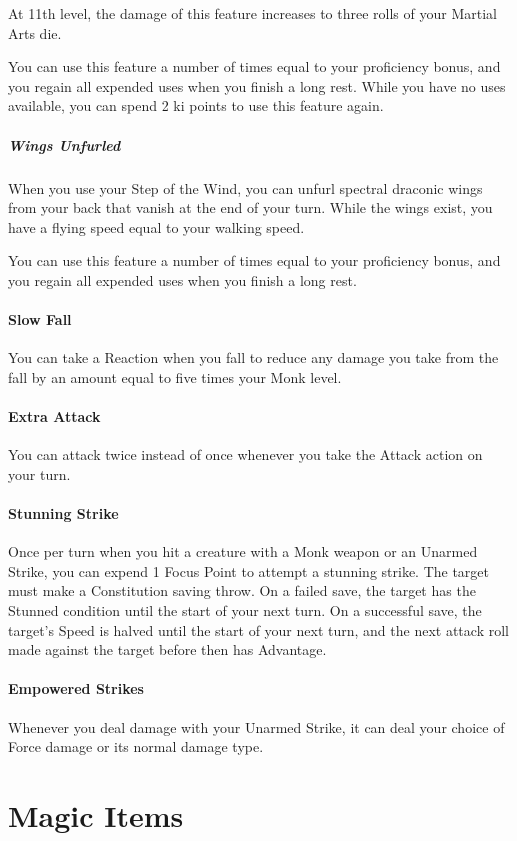 \documentclass[letterpaper,openany,oneside,twocolumn]{book}
\begin{document}
At 11th level, the damage of this feature increases to three rolls of your Martial Arts die.

You can use this feature a number of times equal to your proficiency bonus, and you regain all expended uses when you finish a long rest. While you have no uses available, you can spend 2 ki points to use this feature again.
\subsubsection*{Wings Unfurled}
When you use your Step of the Wind, you can unfurl spectral draconic wings from your back that vanish at the end of your turn. While the wings exist, you have a flying speed equal to your walking speed.

You can use this feature a number of times equal to your proficiency bonus, and you regain all expended uses when you finish a long rest.
\subsection*{Slow Fall}
You can take a Reaction when you fall to reduce any damage you take from the fall by an amount equal to five times your Monk level.
\subsection*{Extra Attack}
You can attack twice instead of once whenever you take the Attack action on your turn.
\subsection*{Stunning Strike}
Once per turn when you hit a creature with a Monk weapon or an Unarmed Strike, you can expend 1 Focus Point to attempt a stunning strike. The target must make a Constitution saving throw. On a failed save, the target has the Stunned condition until the start of your next turn. On a successful save, the target's Speed is halved until the start of your next turn, and the next attack roll made against the target before then has Advantage.
\subsection*{Empowered Strikes}
Whenever you deal damage with your Unarmed Strike, it can deal your choice of Force damage or its normal damage type.

\part*{Magic Items}
\end{document}
